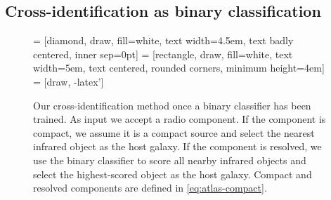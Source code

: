 \documentclass[11pt, a4paper]{book}
\begin{document}
  \subsection{Cross-identification as binary classification}\label{sec:atlas-xid-as-binary-classification}
    \begin{figure}
      \centering
       = [diamond, draw, fill=white,
          text width=4.5em, text badly centered, inner sep=0pt]
       = [rectangle, draw, fill=white,
          text width=5em, text centered, rounded corners, minimum height=4em]
       = [draw, -latex']
      \caption[Our cross-identification method once a binary classifier has been trained.]{{Our cross-identification method once a binary classifier has been trained}. As
        input we accept a radio {component. If the component is compact, we assume it is a compact source and select
        the nearest infrared object as the host galaxy. If the component is
        resolved, we use the binary classifier to score all nearby infrared objects
        and select the highest-scored object as the host galaxy. Compact and resolved components are defined in \autoref{eq:atlas-compact}.}}
      \label{fig:flowchart}
    \end{figure}
\end{document}
